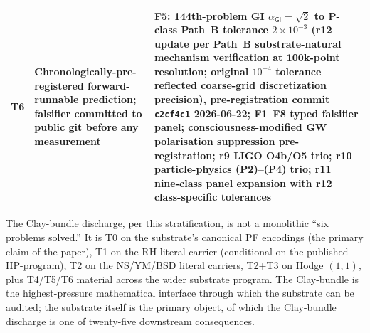 \documentclass[11pt,a4paper]{amsart}
\theoremstyle{plain}
\theoremstyle{definition}
\begin{document}
\begin{center}
\begin{tabular}{@{}p{}p{}p{}@{}}
T6 & Chronologically-pre-registered forward-runnable prediction; falsifier committed to public git before any measurement & F5: 144th-problem GI $\alpha_{\textsf{GI}} = \sqrt{2}$ to P-class Path~B tolerance $2 \times 10^{-3}$ (r12 update per Path~B substrate-natural mechanism verification at 100k-point resolution; original $10^{-4}$ tolerance reflected coarse-grid discretization precision), pre-registration commit \texttt{c2cf4c1} 2026-06-22; F1--F8 typed falsifier panel; consciousness-modified GW polarisation suppression pre-registration; r9 LIGO O4b/O5 trio; r10 particle-physics (P2)--(P4) trio; r11 nine-class panel expansion with r12 class-specific tolerances \\
\bottomrule
\end{tabular}
\end{center}
\vspace{0.3em}

\noindent The Clay-bundle discharge, per this stratification, is not a monolithic ``six problems solved.'' It is T0 on the substrate's canonical PF encodings (the primary claim of the paper), T1 on the RH literal carrier (conditional on the published HP-program), T2 on the NS/YM/BSD literal carriers, T2+T3 on Hodge $(1,1)$, plus T4/T5/T6 material across the wider substrate program. The Clay-bundle is the highest-pressure mathematical interface through which the substrate can be audited; the substrate itself is the primary object, of which the Clay-bundle discharge is one of twenty-five downstream consequences.
\end{document}
